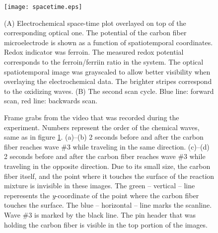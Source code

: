 \documentclass[3p, twocolumn]{elsarticle}
\begin{document}
\def\s{0.5}
\begin{figure}
\centering
{}
\texttt{[image: spacetime.eps]}
\caption{(A) Electrochemical space-time plot overlayed on top of the corresponding optical one.
The potential of the carbon fiber microelectrode is shown as a function of spatiotemporal coordinates.
Redox indicator was ferroin.
The measured redox potential corresponds to the ferroin/ferriin ratio in the system.
The optical spatiotemporal image was grayscaled to allow better visibility when overlaying the electrochemical data.
The brighter stripes correspond to the oxidizing waves.
(B) The second scan cycle.
Blue line: forward scan, red line: backwards scan.
}
\label{fig:spatiotemporal}
\end{figure}

\begin{figure}
\centering
{}
\caption{Frame grabs from the video that was recorded during the experiment.
Numbers represent the order of the chemical waves, same as in figure \ref{fig:spatiotemporal}.
(a)--(b) 2 seconds before and after the carbon fiber reaches wave \#3 while traveling in the same direction.
(c)--(d) 2 seconds before and after the carbon fiber reaches wave \#3 while traveling in the opposite direction.
Due to its small size, the carbon fiber itself, and the point where it touches the surface of the reaction mixture is invisible in these images.
The green -- vertical -- line reperesents the \emph{y}-coordinate of the point where the carbon fiber touches the surface.
The blue -- horizontal -- line marks the scanline.
Wave \#3 is marked by the black line.
The pin header that was holding the carbon fiber is visible in the top portion of the images.
}
\label{fig:grabs2}
\end{figure}
\end{document}
